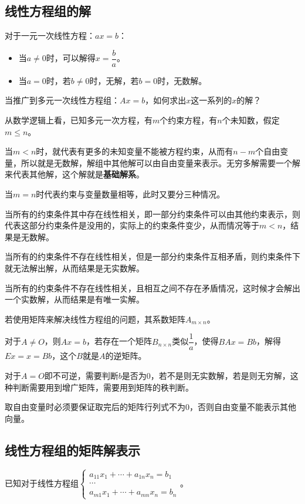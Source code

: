 \documentclass[UTF8, 12pt]{ctexart}
\begin{document}
\subsection{线性方程组的解}

对于一元一次线性方程：$ax=b$：

\begin{itemize}
\item 当$a\neq 0$时，可以解得$x=\dfrac{b}{a}$。
\item 当$a=0$时，若$b\neq 0$时，无解，若$b=0$时，无数解。
\end{itemize}

当推广到多元一次线性方程组：$Ax=b$，如何求出$x$这一系列的$x$的解？

从数学逻辑上看，已知多元一次方程，有$m$个约束方程，有$n$个未知数，假定$m\leqslant n$。

当$m<n$时，就代表有更多的未知变量不能被方程约束，从而有$n-m$个自由变量，所以就是无数解，解组中其他解可以由自由变量来表示。无穷多解需要一个解来代表其他解，这个解就是\textbf{基础解系}。

当$m=n$时代表约束与变量数量相等，此时又要分三种情况。

当所有的约束条件其中存在线性相关，即一部分约束条件可以由其他约束表示，则代表这部分约束条件是没用的，实际上的约束条件变少，从而情况等于$m<n$，结果是无数解。

当所有的约束条件不存在线性相关，但是一部分约束条件互相矛盾，则约束条件下就无法解出解，从而结果是无实数解。

当所有的约束条件不存在线性相关，且相互之间不存在矛盾情况，这时候才会解出一个实数解，从而结果是有唯一实解。

若使用矩阵来解决线性方程组的问题，其系数矩阵$A_{m\times n}$。

对于$A\neq O$，则$Ax=b$，若存在一个矩阵$B_{n\times n}$类似$\dfrac{1}{a}$，使得$BAx=Bb$，解得$Ex=x=Bb$，这个$B$就是$A$的逆矩阵。

对于$A=O$即不可逆，需要判断$b$是否为0，若不是则无实数解，若是则无穷解，这种判断需要用到增广矩阵，需要用到矩阵的秩判断。

取自由变量时必须要保证取完后的矩阵行列式不为0，否则自由变量不能表示其他向量。

\subsection{线性方程组的矩阵解表示}

已知对于线性方程组$\begin{cases}
a_{11}x_1+\cdots+a_{1n}x_n=b_1 \\
\cdots \\
a_{m1}x_1+\cdots+a_{mn}x_n=b_n
\end{cases}$。
\end{document}
